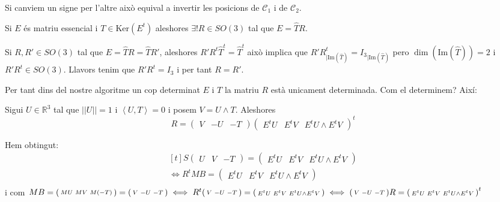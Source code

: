 \documentclass[../main.tex]{subfiles}
\begin{document}
\begin{enumerate}
		\begin{obs}
			Si canviem un signe per l'altre això equival a invertir les posicions de $\mathcal{C}_1$ i de $\mathcal{C}_2$.
		\end{obs}
		\begin{proposicio}
			Si $E$ és matriu essencial i $T \in \text{Ker}(E^t)$ aleshores $\exists!R\in SO(3)$ tal que $E = \hat{T}R$.
		\end{proposicio}
		\begin{demostracio}
			Si $R, R' \in SO(3)$ tal que $E = \hat{T}R = \hat{T}R'$, aleshores $R'R^t\hat{T}^t = \hat{T}^t$ això implica que $R'R^t_{|\text{Im}(\hat{T})} = {I_3}_{|\text{Im}(\hat{T})}$ pero $\dim(\text{Im}(\hat{T})) = 2$ i $R'R^t \in SO(3)$. Llavors tenim que $R'R^t = I_3$ i per tant $R = R'$.
		\end{demostracio}
		Per tant dins del nostre algoritme un cop determinat $E$ i $T$ la matriu $R$ està unicament determinada. Com el determinem? Així:
		\begin{proposicio}
			Sigui $U \in \mathbb{R}^3$ tal que $||U|| = 1$ i $\left\langle U, T \right\rangle = 0$ i posem $V = U \wedge T$. Aleshores
			\begin{displaymath}
				R = \begin{pmatrix}V&-U&-T\end{pmatrix}\begin{pmatrix}E^tU&E^tV&E^tU\wedge E^tV\end{pmatrix}^t
			\end{displaymath}
		\end{proposicio}
		\begin{demostracio}
			Hem obtingut:
			\begin{displaymath}
				\begin{aligned}[t]
					S \begin{pmatrix} U & V & -T \end{pmatrix} = \begin{pmatrix} E^tU & E^tV & E^tU \wedge E^tV \end{pmatrix}\\
					\iff R^tMB = \begin{pmatrix} E^tU & E^tV & E^tU \wedge E^tV \end{pmatrix}\\
				\end{aligned}
			\end{displaymath}
			i com $MB = \begin{psmallmatrix}MU & MV & M(-T)\end{psmallmatrix} = \begin{psmallmatrix}V & -U & -T\end{psmallmatrix} \iff R^t\begin{psmallmatrix}V & -U & -T\end{psmallmatrix} = \begin{psmallmatrix}E^tU & E^tV & E^tU \wedge E^tV\end{psmallmatrix} \iff \begin{psmallmatrix}V & -U & -T\end{psmallmatrix}R = \begin{psmallmatrix}E^tU & E^tV & E^tU \wedge E^tV\end{psmallmatrix}^t$

\end{demostracio}
\end{enumerate}
\end{document}
